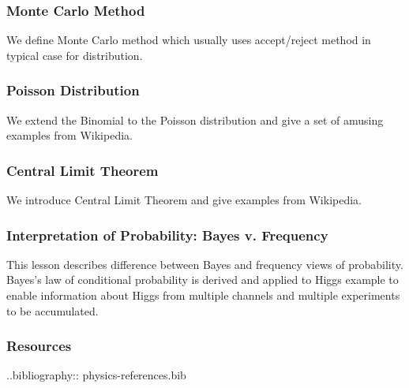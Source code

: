\subsubsection{Monte Carlo Method}\label{monte-carlo-method}

We define Monte Carlo method which usually uses accept/reject method in
typical case for distribution.


\subsubsection{Poisson Distribution}\label{poisson-distribution}

We extend the Binomial to the Poisson distribution and give a set of
amusing examples from Wikipedia.


\subsubsection{Central Limit Theorem}\label{central-limit-theorem}

We introduce Central Limit Theorem and give examples from Wikipedia.


\subsubsection{Interpretation of Probability: Bayes v.
Frequency}\label{interpretation-of-probability-bayes-v.-frequency}

This lesson describes difference between Bayes and frequency views of
probability. Bayes's law of conditional probability is derived and
applied to Higgs example to enable information about Higgs from multiple
channels and multiple experiments to be accumulated.


\subsubsection{Resources}\label{resources-3}

..bibliography:: physics-references.bib
